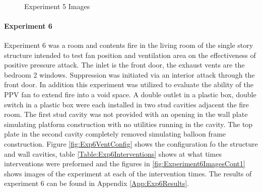 \documentclass{article}
\begin{document}
\begin{figure}[H]
	\ContinuedFloat 
	\centering 
	 \ 
	\caption{Experiment 5 Images}
	\label{fig:Experiment5ImagesCont3} 
\end{figure}

\clearpage

\paragraph{Experiment 6}\mbox{}

Experiment 6 was a room and contents fire in the living room of the single story structure intended to test fan position and ventilation area on the effectiveness of positive pressure attack. The inlet is the front door, the exhaust vents are the bedroom 2 windows. Suppression was initiated via an interior attack through the front door. In addition this experiment was utilized to evaluate the ability of the PPV fan to extend fire into a void space. A double outlet in a plastic box, double switch in a plastic box were each installed in two stud cavities adjacent the fire room. The first stud cavity was not provided with an opening in the wall plate simulating platform construction with no utilities running in the cavity. The top plate in the second cavity completely removed simulating balloon frame construction. Figure \ref{fig:Exp6VentConfig} shows the configuration fo the structure and wall cavities, table \ref{Table:Exp6Interventions} shows at what times interventions were preformed and the figures in \ref{fig:Experiment6ImagesCont1} shows images of the experiment at each of the intervention times. The results of experiment 6 can be found in Appendix \ref{App:Exp6Results}.
\end{document}
